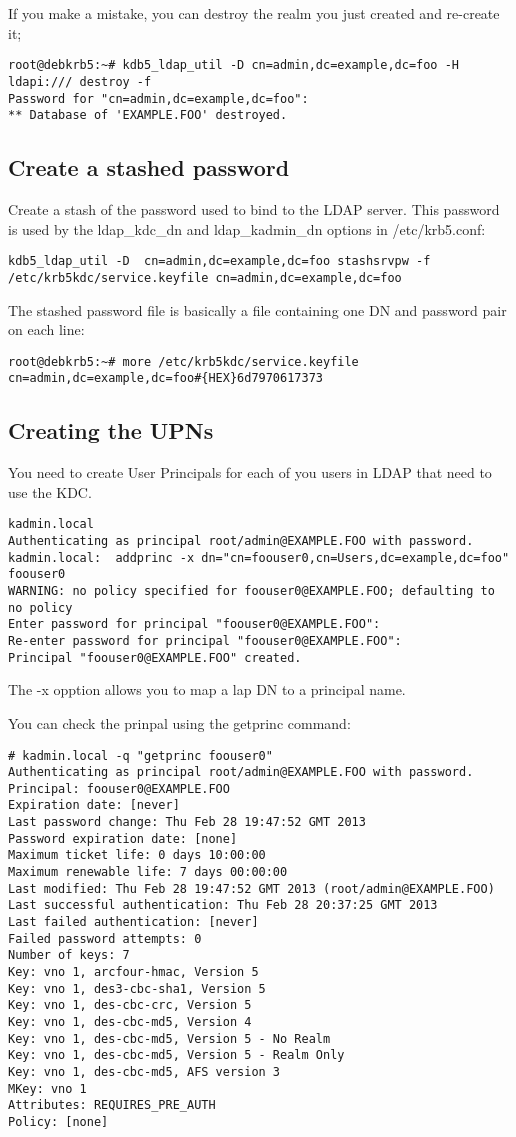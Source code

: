 \documentclass[12pt,a4]{article}
\begin{document}
If you make a mistake, you can destroy the realm you just created and re-create it; 
\begin{verbatim}
root@debkrb5:~# kdb5_ldap_util -D cn=admin,dc=example,dc=foo -H ldapi:/// destroy -f
Password for "cn=admin,dc=example,dc=foo": 
** Database of 'EXAMPLE.FOO' destroyed.
\end{verbatim}


\subsection{Create a stashed password}
Create a stash of the password used to bind to the LDAP server. This password is used by the ldap\_kdc\_dn and ldap\_kadmin\_dn options in /etc/krb5.conf:
\begin{verbatim}
kdb5_ldap_util -D  cn=admin,dc=example,dc=foo stashsrvpw -f /etc/krb5kdc/service.keyfile cn=admin,dc=example,dc=foo
\end{verbatim}
The stashed password file is basically a file containing one DN and password pair on each line:
\begin{verbatim}
root@debkrb5:~# more /etc/krb5kdc/service.keyfile
cn=admin,dc=example,dc=foo#{HEX}6d7970617373
\end{verbatim}

\subsection{Creating the UPNs}
You need to create User Principals for each of you users in LDAP that need to use the KDC.

\begin{verbatim}
kadmin.local
Authenticating as principal root/admin@EXAMPLE.FOO with password.
kadmin.local:  addprinc -x dn="cn=foouser0,cn=Users,dc=example,dc=foo" foouser0
WARNING: no policy specified for foouser0@EXAMPLE.FOO; defaulting to no policy
Enter password for principal "foouser0@EXAMPLE.FOO": 
Re-enter password for principal "foouser0@EXAMPLE.FOO": 
Principal "foouser0@EXAMPLE.FOO" created.
\end{verbatim}

The -x opption allows you to map a lap DN to a principal name.

You can check the prinpal using the getprinc command:
\begin{verbatim}
# kadmin.local -q "getprinc foouser0"
Authenticating as principal root/admin@EXAMPLE.FOO with password.
Principal: foouser0@EXAMPLE.FOO
Expiration date: [never]
Last password change: Thu Feb 28 19:47:52 GMT 2013
Password expiration date: [none]
Maximum ticket life: 0 days 10:00:00
Maximum renewable life: 7 days 00:00:00
Last modified: Thu Feb 28 19:47:52 GMT 2013 (root/admin@EXAMPLE.FOO)
Last successful authentication: Thu Feb 28 20:37:25 GMT 2013
Last failed authentication: [never]
Failed password attempts: 0
Number of keys: 7
Key: vno 1, arcfour-hmac, Version 5
Key: vno 1, des3-cbc-sha1, Version 5
Key: vno 1, des-cbc-crc, Version 5
Key: vno 1, des-cbc-md5, Version 4
Key: vno 1, des-cbc-md5, Version 5 - No Realm
Key: vno 1, des-cbc-md5, Version 5 - Realm Only
Key: vno 1, des-cbc-md5, AFS version 3
MKey: vno 1
Attributes: REQUIRES_PRE_AUTH
Policy: [none]
\end{verbatim}
\end{document}
